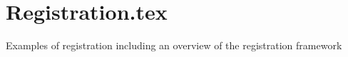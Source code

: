 \chapter{Registration.tex}

Examples of registration including an overview of the registration framework
